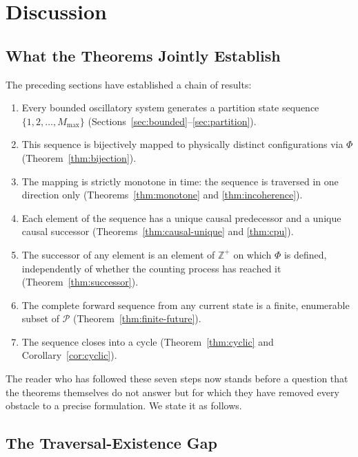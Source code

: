 \documentclass[twocolumn,10pt,a4paper]{article}
\theoremstyle{thmstyle}
\theoremstyle{definition}
\theoremstyle{remark}
\newcommand{\Zp}{\mathbb{Z}^{+}}
\newcommand{\Parts}{\mathcal{P}}
\newcommand{\Mmax}{M_{\max}}
\newcommand{\PhiMap}{\varPhi}
\begin{document}
\section{Discussion}
\label{sec:discussion}

\subsection{What the Theorems Jointly Establish}

The preceding sections have established a chain of results:

\begin{enumerate}[leftmargin=1.5em,itemsep=0.2em]
\item Every bounded oscillatory system generates a partition state sequence $\{1, 2, \ldots, \Mmax\}$ (Sections~\ref{sec:bounded}--\ref{sec:partition}).
\item This sequence is bijectively mapped to physically distinct configurations via $\PhiMap$ (Theorem~\ref{thm:bijection}).
\item The mapping is strictly monotone in time: the sequence is traversed in one direction only (Theorems~\ref{thm:monotone} and \ref{thm:incoherence}).
\item Each element of the sequence has a unique causal predecessor and a unique causal successor (Theorems~\ref{thm:causal-unique} and \ref{thm:cpu}).
\item The successor of any element is an element of $\Zp$ on which $\PhiMap$ is defined, independently of whether the counting process has reached it (Theorem~\ref{thm:successor}).
\item The complete forward sequence from any current state is a finite, enumerable subset of $\Parts$ (Theorem~\ref{thm:finite-future}).
\item The sequence closes into a cycle (Theorem~\ref{thm:cyclic} and Corollary~\ref{cor:cyclic}).
\end{enumerate}

The reader who has followed these seven steps now stands before a question that the theorems themselves do not answer but for which they have removed every obstacle to a precise formulation. We state it as follows.

\subsection{The Traversal-Existence Gap}
\end{document}
